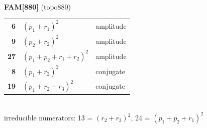 \documentclass[10pt]{article}
\begin{document}
\begin{minipage}[t]{0.48\textwidth}
{}\\[2mm]\textbf{FAM[880]} (topo880)\\[2pt]{\footnotesize\begin{tabular}{@{}r@{\ \ }l@{\ \ }l@{}}\textbf{6} & $(p_1+r_1)^2$ & amplitude\\
\textbf{9} & $(p_2+r_2)^2$ & amplitude\\
\textbf{27} & $(p_1+p_2+r_1+r_2)^2$ & amplitude\\
\textbf{8} & $(p_1+r_2)^2$ & conjugate\\
\textbf{19} & $(p_1+r_2+r_3)^2$ & conjugate\\\end{tabular}}\\[2pt]{\scriptsize irreducible numerators: 13 = $(r_2+r_3)^2$, 24 = $(p_1+p_2+r_1)^2$}\end{minipage}

\bigskip
\end{document}
